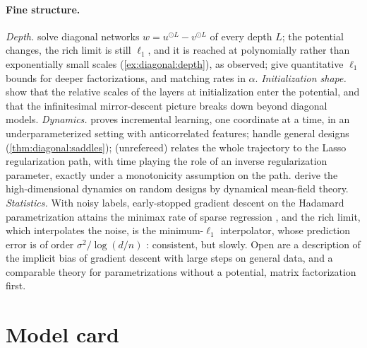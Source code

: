 \begin{refsection}
\paragraph{Fine structure.} \emph{Depth.} \Textcite{WoodworthEtAl2020} solve diagonal networks $w=u^{\odot L}-v^{\odot L}$ of every depth $L$; the potential changes, the rich limit is still $\ell_1$, and it is reached at polynomially rather than exponentially small scales (\cref{ex:diagonal:depth}), as \textcite{GissinShalevShwartzDaniely2020} observed; \textcite{ChouMalyRauhut2023} give quantitative $\ell_1$ bounds for deeper factorizations, and \textcite{MattStoger2025} matching rates in $\alpha$. \emph{Initialization shape.} \Textcite{AzulayEtAl2021} show that the relative scales of the layers at initialization enter the potential, and that the infinitesimal mirror-descent picture breaks down beyond diagonal models. \emph{Dynamics.} \Textcite{Berthier2023} proves incremental learning, one coordinate at a time, in an underparameterized setting with anticorrelated features; \textcite{PesmeFlammarion2023} handle general designs (\cref{thm:diagonal:saddles}); \textcite{Berthier2025} (unrefereed) relates the whole trajectory to the Lasso regularization path, with time playing the role of an inverse regularization parameter, exactly under a monotonicity assumption on the path. \Textcite{NishiyamaImaizumi2026} derive the high-dimensional dynamics on random designs by dynamical mean-field theory. \emph{Statistics.} With noisy labels, early-stopped gradient descent on the Hadamard parametrization attains the minimax rate of sparse regression \parencite{VaskeviciusKanadeRebeschini2019,ZhaoYangHe2022}, and the rich limit, which interpolates the noise, is the minimum-$\ell_1$ interpolator, whose prediction error is of order $\sigma^2/\log(d/n)$ \parencite{WangDonhauserYang2022}: consistent, but slowly. Open are a description of the implicit bias of gradient descent with large steps on general data, and a comparable theory for parametrizations without a potential, matrix factorization first.

\section{Model card}\label{sec:diagonal:card}


\end{refsection}
